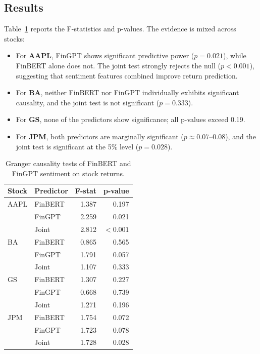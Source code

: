\documentclass[12pt,a4paper]{report}
\begin{document}
\subsection{Results}
Table~\ref{tab:granger} reports the F-statistics and p-values. The evidence is mixed
across stocks:
\begin{itemize}
    \item For \textbf{AAPL}, FinGPT shows significant predictive power ($p=0.021$),
    while FinBERT alone does not. The joint test strongly rejects the null
    ($p<0.001$), suggesting that sentiment features combined improve return prediction.
    \item For \textbf{BA}, neither FinBERT nor FinGPT individually exhibits
    significant causality, and the joint test is not significant ($p=0.333$).
    \item For \textbf{GS}, none of the predictors show significance; all p-values
    exceed 0.19.
    \item For \textbf{JPM}, both predictors are marginally significant
    ($p\approx0.07$--$0.08$), and the joint test is significant at the 5\% level
    ($p=0.028$).
\end{itemize}

\begin{table}[H]
\centering
\caption{Granger causality tests of FinBERT and FinGPT sentiment on stock returns.}
\label{tab:granger}
\begin{tabular}{l l r r}
\toprule
\textbf{Stock} & \textbf{Predictor} & \textbf{F-stat} & \textbf{p-value} \\
\midrule
AAPL & FinBERT & 1.387 & 0.197 \\
     & FinGPT  & 2.259 & 0.021 \\
     & Joint   & 2.812 & $<0.001$ \\
\midrule
BA   & FinBERT & 0.865 & 0.565 \\
     & FinGPT  & 1.791 & 0.057 \\
     & Joint   & 1.107 & 0.333 \\
\midrule
GS   & FinBERT & 1.307 & 0.227 \\
     & FinGPT  & 0.668 & 0.739 \\
     & Joint   & 1.271 & 0.196 \\
\midrule
JPM  & FinBERT & 1.754 & 0.072 \\
     & FinGPT  & 1.723 & 0.078 \\
     & Joint   & 1.728 & 0.028 \\
\bottomrule
\end{tabular}
\end{table}
\end{document}
